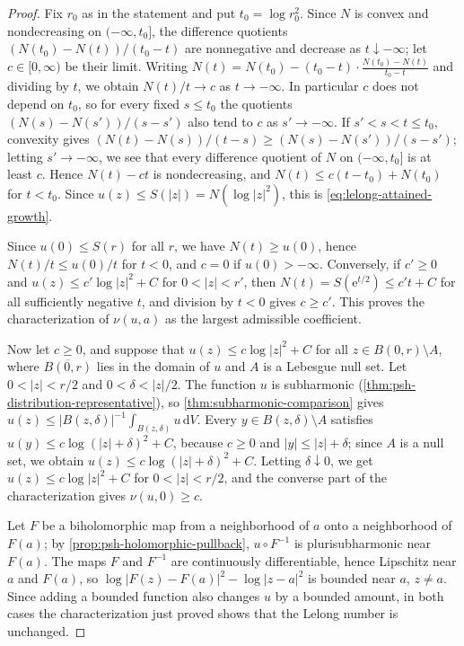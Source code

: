 \begin{proof}
Fix $r_0$ as in the statement and put $t_0=\log r_0^2$. Since $N$ is convex and nondecreasing on $(-\infty,t_0]$, the difference quotients $(N(t_0)-N(t))/(t_0-t)$ are nonnegative and decrease as $t\downarrow-\infty$; let $c\in[0,\infty)$ be their limit. Writing $N(t)=N(t_0)-(t_0-t)\cdot\frac{N(t_0)-N(t)}{t_0-t}$ and dividing by $t$, we obtain $N(t)/t\to c$ as $t\to-\infty$. In particular $c$ does not depend on $t_0$, so for every fixed $s\leq t_0$ the quotients $(N(s)-N(s'))/(s-s')$ also tend to $c$ as $s'\to-\infty$. If $s'<s<t\leq t_0$, convexity gives $(N(t)-N(s))/(t-s)\geq(N(s)-N(s'))/(s-s')$; letting $s'\to-\infty$, we see that every difference quotient of $N$ on $(-\infty,t_0]$ is at least $c$. Hence $N(t)-ct$ is nondecreasing, and $N(t)\leq c(t-t_0)+N(t_0)$ for $t<t_0$. Since $u(z)\leq S(|z|)=N(\log|z|^2)$, this is \eqref{eq:lelong-attained-growth}.

Since $u(0)\leq S(r)$ for all $r$, we have $N(t)\geq u(0)$, hence $N(t)/t\leq u(0)/t$ for $t<0$, and $c=0$ if $u(0)>-\infty$. Conversely, if $c'\geq0$ and $u(z)\leq c'\log|z|^2+C$ for $0<|z|<r'$, then $N(t)=S(\mathrm e^{t/2})\leq c't+C$ for all sufficiently negative $t$, and division by $t<0$ gives $c\geq c'$. This proves the characterization of $\nu(u,a)$ as the largest admissible coefficient.

Now let $c\geq0$, and suppose that $u(z)\leq c\log|z|^2+C$ for all $z\in B(0,r)\setminus A$, where $\overline{B(0,r)}$ lies in the domain of $u$ and $A$ is a Lebesgue null set. Let $0<|z|<r/2$ and $0<\delta<|z|/2$. The function $u$ is subharmonic (\cref{thm:psh-distribution-representative}), so \cref{thm:subharmonic-comparison} gives $u(z)\leq|B(z,\delta)|^{-1}\int_{B(z,\delta)}u\,\mathrm dV$. Every $y\in B(z,\delta)\setminus A$ satisfies $u(y)\leq c\log(|z|+\delta)^2+C$, because $c\geq0$ and $|y|\leq|z|+\delta$; since $A$ is a null set, we obtain $u(z)\leq c\log(|z|+\delta)^2+C$. Letting $\delta\downarrow0$, we get $u(z)\leq c\log|z|^2+C$ for $0<|z|<r/2$, and the converse part of the characterization gives $\nu(u,0)\geq c$.

Let $F$ be a biholomorphic map from a neighborhood of $a$ onto a neighborhood of $F(a)$; by \cref{prop:psh-holomorphic-pullback}, $u\circ F^{-1}$ is plurisubharmonic near $F(a)$. The maps $F$ and $F^{-1}$ are continuously differentiable, hence Lipschitz near $a$ and $F(a)$, so $\log|F(z)-F(a)|^2-\log|z-a|^2$ is bounded near $a$, $z\neq a$. Since adding a bounded function also changes $u$ by a bounded amount, in both cases the characterization just proved shows that the Lelong number is unchanged.
\end{proof}

